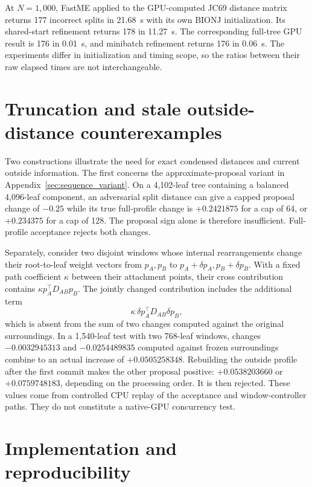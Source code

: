 At $N=1{,}000$, FastME applied to the GPU-computed JC69 distance matrix returns 177 incorrect splits in 21.68~s with its own BIONJ initialization.
Its shared-start refinement returns 178 in 11.27~s.
The corresponding full-tree GPU result is 176 in 0.01~s, and minibatch refinement returns 176 in 0.06~s.
The experiments differ in initialization and timing scope, so the ratios between their raw elapsed times are not interchangeable.


\section{Truncation and stale outside-distance counterexamples}
\label{sec:counterexamples}

Two constructions illustrate the need for exact condensed distances and current outside information.
The first concerns the approximate-proposal variant in Appendix~\ref{sec:sequence_variant}.
On a 4,102-leaf tree containing a balanced 4,096-leaf component, an adversarial split distance can give a capped proposal change of $-0.25$ while its true full-profile change is $+0.2421875$ for a cap of 64, or $+0.234375$ for a cap of 128.
The proposal sign alone is therefore insufficient.
Full-profile acceptance rejects both changes.

Separately, consider two disjoint windows whose internal rearrangements change their root-to-leaf weight vectors from $p_A,p_B$ to $p_A+\delta p_A,p_B+\delta p_B$.
With a fixed path coefficient $\kappa$ between their attachment points, their cross contribution contains
$\kappa p_A^\top D_{AB}p_B$.
The jointly changed contribution includes the additional term
\[
 \kappa\,\delta p_A^\top D_{AB}\delta p_B,
\]
which is absent from the sum of two changes computed against the original surroundings.
In a 1,540-leaf test with two 768-leaf windows, changes
$-0.0032945313$ and $-0.0254489835$ computed against frozen surroundings combine to an actual increase of $+0.0505258348$.
Rebuilding the outside profile after the first commit makes the other proposal positive:
$+0.0538203660$ or $+0.0759748183$, depending on the processing order.
It is then rejected.
These values come from controlled CPU replay of the acceptance and window-controller paths.
They do not constitute a native-GPU concurrency test.

\section{Implementation and reproducibility}
\label{sec:software}

